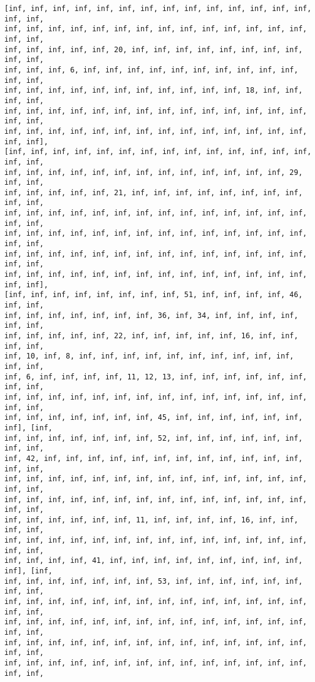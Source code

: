 \documentclass[11pt]{article}
\begin{document}
\begin{Verbatim}[commandchars=\\\{\}]
[inf, inf, inf, inf, inf, inf, inf, inf, inf, inf, inf, inf, inf, inf, inf, inf,
inf, inf, inf, inf, inf, inf, inf, inf, inf, inf, inf, inf, inf, inf, inf, inf,
inf, inf, inf, inf, inf, 20, inf, inf, inf, inf, inf, inf, inf, inf, inf, inf,
inf, inf, inf, 6, inf, inf, inf, inf, inf, inf, inf, inf, inf, inf, inf, inf,
inf, inf, inf, inf, inf, inf, inf, inf, inf, inf, inf, 18, inf, inf, inf, inf,
inf, inf, inf, inf, inf, inf, inf, inf, inf, inf, inf, inf, inf, inf, inf, inf,
inf, inf, inf, inf, inf, inf, inf, inf, inf, inf, inf, inf, inf, inf, inf, inf],
[inf, inf, inf, inf, inf, inf, inf, inf, inf, inf, inf, inf, inf, inf, inf, inf,
inf, inf, inf, inf, inf, inf, inf, inf, inf, inf, inf, inf, inf, 29, inf, inf,
inf, inf, inf, inf, inf, 21, inf, inf, inf, inf, inf, inf, inf, inf, inf, inf,
inf, inf, inf, inf, inf, inf, inf, inf, inf, inf, inf, inf, inf, inf, inf, inf,
inf, inf, inf, inf, inf, inf, inf, inf, inf, inf, inf, inf, inf, inf, inf, inf,
inf, inf, inf, inf, inf, inf, inf, inf, inf, inf, inf, inf, inf, inf, inf, inf,
inf, inf, inf, inf, inf, inf, inf, inf, inf, inf, inf, inf, inf, inf, inf, inf],
[inf, inf, inf, inf, inf, inf, inf, inf, 51, inf, inf, inf, inf, 46, inf, inf,
inf, inf, inf, inf, inf, inf, inf, 36, inf, 34, inf, inf, inf, inf, inf, inf,
inf, inf, inf, inf, inf, 22, inf, inf, inf, inf, inf, 16, inf, inf, inf, inf,
inf, 10, inf, 8, inf, inf, inf, inf, inf, inf, inf, inf, inf, inf, inf, inf,
inf, 6, inf, inf, inf, inf, 11, 12, 13, inf, inf, inf, inf, inf, inf, inf, inf,
inf, inf, inf, inf, inf, inf, inf, inf, inf, inf, inf, inf, inf, inf, inf, inf,
inf, inf, inf, inf, inf, inf, inf, 45, inf, inf, inf, inf, inf, inf, inf], [inf,
inf, inf, inf, inf, inf, inf, inf, 52, inf, inf, inf, inf, inf, inf, inf, inf,
inf, 42, inf, inf, inf, inf, inf, inf, inf, inf, inf, inf, inf, inf, inf, inf,
inf, inf, inf, inf, inf, inf, inf, inf, inf, inf, inf, inf, inf, inf, inf, inf,
inf, inf, inf, inf, inf, inf, inf, inf, inf, inf, inf, inf, inf, inf, inf, inf,
inf, inf, inf, inf, inf, inf, 11, inf, inf, inf, inf, 16, inf, inf, inf, inf,
inf, inf, inf, inf, inf, inf, inf, inf, inf, inf, inf, inf, inf, inf, inf, inf,
inf, inf, inf, inf, 41, inf, inf, inf, inf, inf, inf, inf, inf, inf, inf], [inf,
inf, inf, inf, inf, inf, inf, inf, 53, inf, inf, inf, inf, inf, inf, inf, inf,
inf, inf, inf, inf, inf, inf, inf, inf, inf, inf, inf, inf, inf, inf, inf, inf,
inf, inf, inf, inf, inf, inf, inf, inf, inf, inf, inf, inf, inf, inf, inf, inf,
inf, inf, inf, inf, inf, inf, inf, inf, inf, inf, inf, inf, inf, inf, inf, inf,
inf, inf, inf, inf, inf, inf, inf, inf, inf, inf, inf, inf, inf, inf, inf, inf,

\end{Verbatim}
\end{document}
